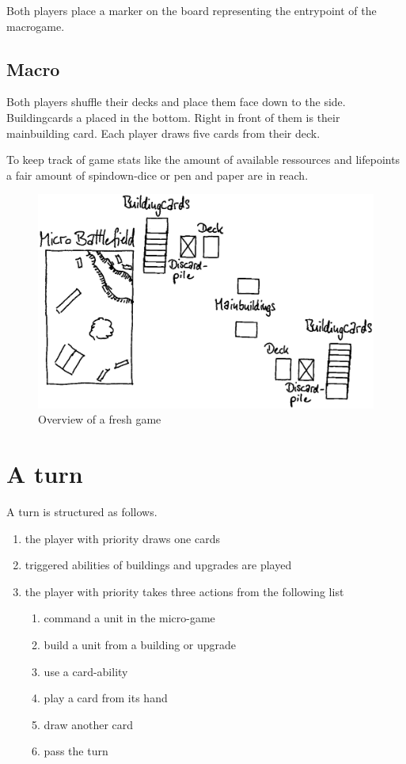 \documentclass[a5paper,pagesize,10pt,bibtotoc,pointlessnumbers,
normalheadings,DIV=9,twoside=false]{scrbook}
\begin{document}
Both players place a marker on the board representing the entrypoint of the macrogame.

\subsection{Macro}
Both players shuffle their decks and place them face down to the side. Buildingcards a placed in the bottom. Right in front of them is their mainbuilding card. Each player draws five cards from their deck.

To keep track of game stats like the amount of available ressources and lifepoints a fair amount of spindown-dice or pen and paper are in reach.

\begin{figure}[t]
\includegraphics[scale=0.25]{Boardoverview}
\centering
\caption{Overview of a fresh game}
\end{figure}

\section{A turn}
A turn is structured as follows.

\begin{enumerate}
\item the player with priority draws one cards
\item triggered abilities of buildings and upgrades are played
\item the player with priority takes three actions from the following list
\begin{enumerate}
\item command a unit in the micro-game
\item build a unit from a building or upgrade
\item use a card-ability
\item play a card from its hand
\item draw another card
\item pass the turn
\end{enumerate}
\end{enumerate}
\end{document}
